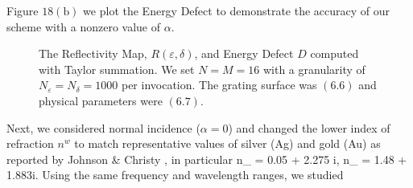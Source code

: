 Figure $18(\text{b})$ we plot the Energy Defect
to demonstrate the accuracy of our scheme with
a nonzero value of $\alpha$.
%
%
\vspace{-17mm}
\begin{figure}[H]
    \centering
    \vspace{3mm}
    \caption{The Reflectivity Map, $R(\varepsilon,\delta)$, and Energy Defect $D$
    computed with Taylor summation. We set $N=M=16$
    with a granularity of $N_{\varepsilon}=N_{\delta}=1000$ per invocation. The grating surface was $(6.6)$ and physical parameters were $(6.7)$.}
    \label{Fig:RM:Dielectric:Fine}
\end{figure}
\vspace{-17mm}
Next, we considered normal incidence ($\alpha = 0$) and changed the lower index of refraction $n^w$ to match representative values
of silver (Ag) and gold (Au) as reported by Johnson \& Christy 
\cite{JohnsonChristy72}, in particular
\bes
n_{} = 0.05 + 2.275 i,
\quad
n_{} = 1.48 + 1.883i.
\ees
Using the same frequency and wavelength ranges, we studied
